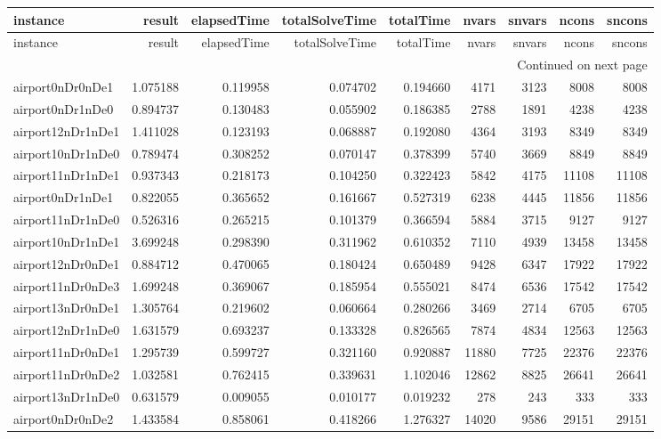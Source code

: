 \begin{longtable}{|l|r|r|r|r|r|r|r|r|}
\toprule
instance & result & elapsedTime & totalSolveTime & totalTime & nvars & snvars & ncons & sncons \\
\midrule
\endfirsthead
\toprule
instance & result & elapsedTime & totalSolveTime & totalTime & nvars & snvars & ncons & sncons \\
\midrule
\endhead
\midrule
\multicolumn{9}{r}{Continued on next page} \\
\midrule
\endfoot
\bottomrule
\endlastfoot
airport0nDr0nDe1 & 1.075188 & 0.119958 & 0.074702 & 0.194660 & 4171 & 3123 & 8008 & 8008 \\
airport0nDr1nDe0 & 0.894737 & 0.130483 & 0.055902 & 0.186385 & 2788 & 1891 & 4238 & 4238 \\
airport12nDr1nDe1 & 1.411028 & 0.123193 & 0.068887 & 0.192080 & 4364 & 3193 & 8349 & 8349 \\
airport10nDr1nDe0 & 0.789474 & 0.308252 & 0.070147 & 0.378399 & 5740 & 3669 & 8849 & 8849 \\
airport11nDr1nDe1 & 0.937343 & 0.218173 & 0.104250 & 0.322423 & 5842 & 4175 & 11108 & 11108 \\
airport0nDr1nDe1 & 0.822055 & 0.365652 & 0.161667 & 0.527319 & 6238 & 4445 & 11856 & 11856 \\
airport11nDr1nDe0 & 0.526316 & 0.265215 & 0.101379 & 0.366594 & 5884 & 3715 & 9127 & 9127 \\
airport10nDr1nDe1 & 3.699248 & 0.298390 & 0.311962 & 0.610352 & 7110 & 4939 & 13458 & 13458 \\
airport12nDr0nDe1 & 0.884712 & 0.470065 & 0.180424 & 0.650489 & 9428 & 6347 & 17922 & 17922 \\
airport11nDr0nDe3 & 1.699248 & 0.369067 & 0.185954 & 0.555021 & 8474 & 6536 & 17542 & 17542 \\
airport13nDr0nDe1 & 1.305764 & 0.219602 & 0.060664 & 0.280266 & 3469 & 2714 & 6705 & 6705 \\
airport12nDr1nDe0 & 1.631579 & 0.693237 & 0.133328 & 0.826565 & 7874 & 4834 & 12563 & 12563 \\
airport11nDr0nDe1 & 1.295739 & 0.599727 & 0.321160 & 0.920887 & 11880 & 7725 & 22376 & 22376 \\
airport11nDr0nDe2 & 1.032581 & 0.762415 & 0.339631 & 1.102046 & 12862 & 8825 & 26641 & 26641 \\
airport13nDr1nDe0 & 0.631579 & 0.009055 & 0.010177 & 0.019232 & 278 & 243 & 333 & 333 \\
airport0nDr0nDe2 & 1.433584 & 0.858061 & 0.418266 & 1.276327 & 14020 & 9586 & 29151 & 29151 \\

\end{longtable}
